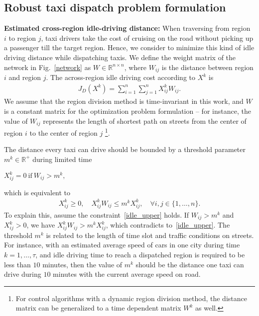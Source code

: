 \documentclass[10pt,twocolumn,twoside,english]{IEEEtran}
\begin{document}
\subsection{Robust taxi dispatch problem formulation}
\label{dispatch_form}
\textbf{Estimated cross-region idle-driving distance:}
When traversing from region $i$ to region $j$,  taxi drivers take the cost of cruising on the road without picking up a passenger till the target region. Hence, we consider to minimize this kind of idle driving distance while dispatching taxis. We define the weight matrix of the network in Fig.~\ref{network} as $W\in \mathbb{R}^{n\times n}$, where $W_{ij}$ is the distance between region $i$ and region $j$. The across-region idle driving cost according to $X^k$ is 
\begin{align}
J_D (X^k) = \sum_{i=1}^{n} \sum_{j=1}^n X^k_{ij} W_{ij}.
\label{JD}
\end{align}
We assume that the region division method is time-invariant in this work, and $W$ is a constant matrix for the optimization problem formulation -- for instance, the value of $W_{ij}$ represents the length of shortest path on streets from the center of region $i$ to the center of region $j$
\footnote{For control algorithms with a dynamic region division method, the distance matrix can be generalized to a time dependent matrix $W^k$ as well.}.



The distance every taxi can drive should be bounded by a threshold parameter $m^k \in \mathbb{R}^+$ during limited time 
\centerline{$ 
X^k_{ij}=0\  \text{if}\ W_{ij} > m^k, 
$}
which is equivalent to 
 \begin{align}
X_{ij}^k \geqslant 0,\quad X_{ij}^k W_{ij} \leq m^k X^k_{ij},\quad \forall i, j \in \{1, \dots, n\}.
\label{idle_upper}
\end{align}
To explain this, assume the constraint~\eqref{idle_upper} holds. If $W_{ij} >m^k$ and $X^k_{ij}>0$, we have $X_{ij}^k W_{ij} > m^k X^k_{ij}$, which contradicts to~\eqref{idle_upper}. The threshold $m^k$ is related to the length of time slot and traffic conditions on streets. For instance, with an estimated average speed of cars in one city during time $k=1,\dots,\tau$, and idle driving time to reach a dispatched region is required to be less than $10$ minutes, then the value of $m^k$ should be the distance one taxi can drive during $10$ minutes with the current average speed on road.\iffalse
We prove by contradiction. Assume is true. Based on the constraint $X^k_{ij} \geq 0, $ if $X^k_{ij} \neq 0$, we must have $X^k_{ij} >0$. When the constraint $X_{ij}^k W_ij \leq m X_{ij}$ is satisfied,  by deriving the left and right side of the inequality by $X_{ij}^k >0$, we have
\begin{align*}
W_{ij} \leq m,
\end{align*}
which is contradicted with $W_{ij} > m$.
\fi
\end{document}
